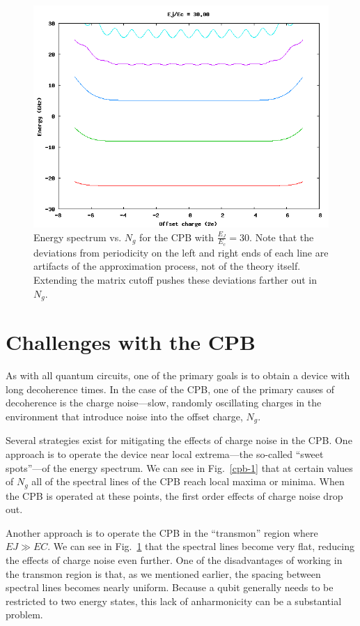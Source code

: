 \documentclass[twocolumn]{revtex4}
\begin{document}
\begin{figure}
  \includegraphics[width=\linewidth]{CPB-30.png}
  \caption{Energy spectrum vs. $N_g$ for the CPB with
    $\frac{E_J}{E_c}=30$. Note that the deviations from periodicity on
    the left and right ends of each line are artifacts of the
    approximation process, not of the theory itself. Extending the
    matrix cutoff pushes these deviations farther out in $N_g$.}
  \label{cpb-30}
\end{figure}

\section{Challenges with the CPB}
As with all quantum circuits, one of the primary goals is to obtain a
device with long decoherence times. In the case of the CPB, one of the
primary causes of decoherence is the charge noise---slow, randomly
oscillating charges in the environment that introduce noise into the
offset charge, $N_g$.

Several strategies exist for mitigating the effects of charge noise in
the CPB. One approach is to operate the device near local
extrema---the so-called ``sweet spots''---of the energy
spectrum\cite{Vion}. We can see in Fig.~\ref{cpb-1} that at certain
values of $N_g$ all of the spectral lines of the CPB reach local
maxima or minima. When the CPB is operated at these points, the first
order effects of charge noise drop out.

Another approach is to operate the CPB in the ``transmon'' region
where $EJ\gg EC$\cite{Koch}. We can see in Fig.~\ref{cpb-30} that the
spectral lines become very flat, reducing the effects of charge noise
even further. One of the disadvantages of working in the transmon
region is that, as we mentioned earlier, the spacing between spectral
lines becomes nearly uniform. Because a qubit generally needs to be
restricted to two energy states, this lack of anharmonicity can be a
substantial problem.
\end{document}
